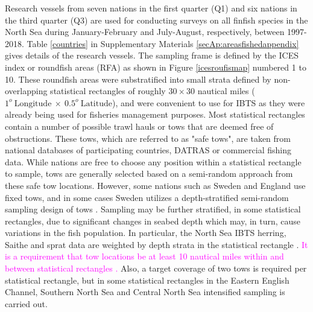 \documentclass[a4paper 12pt]{article}
\numberwithin{equation}{section}
\newcommand{\natty}[1]{\textcolor{magenta}{#1}}
\begin{document}
Research vessels from seven nations in the first quarter (Q1) and six nations in the third quarter (Q3) are used for conducting surveys on all finfish species in the North Sea during January-February and July-August, respectively, between 1997-2018. Table \ref{countries} in Supplementary Materials \ref{secAp:areasfishedappendix} gives details of the research vessels. The sampling frame is defined by the ICES index or roundfish areas (RFA) as shown in Figure \ref{icesroufismap} numbered 1 to 10. These  roundfish areas were substratified into small strata defined by non-overlapping statistical rectangles of roughly $30 \times 30$ nautical miles ($1^{o} \  \mathrm{Longitude} \ \times  \  0.5^{o} \ \mathrm{Latitude}$), and were convenient to use for IBTS as they were already being used for fisheries management purposes. Most statistical rectangles contain a number of possible trawl hauls or tows that are deemed free of obstructions. These tows, which are referred to as   "safe tows", are taken from national databases of participating countries, DATRAS \citep{datras} or commercial fishing data. While nations are free to choose any position within a statistical rectangle to sample, tows are generally selected based on a semi-random approach from these safe tow locations. However, some nations such as Sweden and England use fixed tows, and in some cases Sweden utilizes a depth-stratified semi-random sampling design of tows \citep{ICES2018}. Sampling may be further stratified, in some statistical rectangles, due to significant changes in seabed depth which may, in turn, cause variations in the fish population. In particular, the North Sea IBTS herring, Saithe and sprat data are weighted by depth strata in the statistical rectangle \citep{ICES2013}. \natty{It is a requirement that tow locations be at least 10 nautical miles within and between statistical rectangles \citep{ICES2018}.} Also, a target coverage of two tows is required per statistical rectangle\citep{ICES2015}, but in some statistical rectangles in the Eastern English Channel, Southern North Sea and Central North Sea intensified sampling is carried out.
\end{document}
